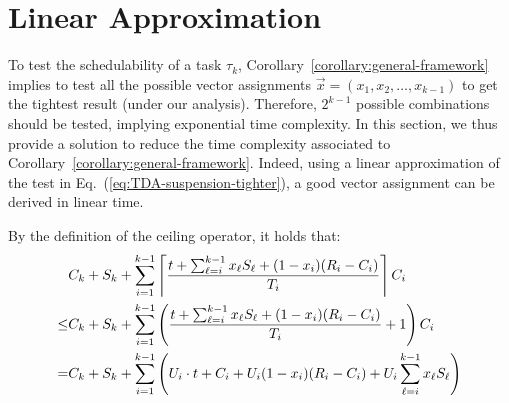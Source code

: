 \section{Linear Approximation}
\label{sec:linear-approximation}

To test the schedulability of a task $\tau_k$,
Corollary~\ref{corollary:general-framework} implies to test all the
possible vector assignments $\vec{x} = (x_1, x_2, \ldots, x_{k-1})$ to get the tightest result (under our analysis). Therefore, $2^{k-1}$ possible combinations should be tested, implying exponential time complexity. In this section, we thus provide a solution to reduce the time complexity associated to
Corollary~\ref{corollary:general-framework}. Indeed, using a linear approximation of the test in Eq.~(\ref{eq:TDA-suspension-tighter}), a good vector assignment can be derived in linear time. 

By the definition of the ceiling operator, it holds that:
{\footnotesize \begin{align}
&C_k + S_k + \sum_{i=1}^{k-1}\ceiling{\frac{t+\sum_{\ell=i}^{k-1}x_\ell S_\ell+(1-x_i)(R_i-C_i)}{T_i}} C_i \nonumber\\
\leq& C_k + S_k  +   \sum_{i=1}^{k-1} \left(\frac{t+\sum_{\ell=i}^{k-1}x_\ell S_\ell +(1-x_i)(R_i-C_i)}{T_i} +1\right) C_i \nonumber\\
=& C_k + S_k  + \sum_{i=1}^{k-1} \left(U_i\cdot t + C_i+U_i (1-x_i)(R_i-C_i) + U_i\sum_{\ell=i}^{k-1}x_\ell S_\ell \right) \label{eq:linear_step1}
\end{align}}





